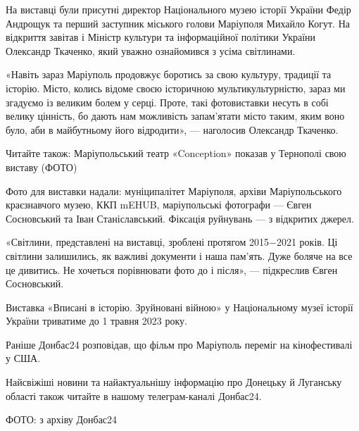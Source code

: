 На виставці були присутні директор Національного музею історії України Федір
Андрощук та перший заступник міського голови Маріуполя Михайло Когут. На
відкриття завітав і Міністр культури та інформаційної політики України
Олександр Ткаченко, який уважно ознайомився з усіма світлинами.

«Навіть зараз Маріуполь продовжує боротись за свою культуру, традиції та
історію. Місто, колись відоме своєю історичною мультикультурністю, зараз ми
згадуємо із великим болем у серці. Проте, такі фотовиставки несуть в собі
велику цінність, бо дають нам можливість запам’ятати місто таким, яким воно
було, аби в майбутньому його відродити», — наголосив Олександр Ткаченко.

Читайте також: Маріупольський театр «Conception» показав у Тернополі свою
виставу (ФОТО)

Фото для виставки надали: муніципалітет Маріуполя, архіви Маріупольського
краєзнавчого музею, ККП mEHUB, маріупольські фотографи — Євген Сосновський та
Іван Станіславський. Фіксація руйнувань — з відкритих джерел.

«Світлини, представлені на виставці, зроблені протягом 2015−2021 років. Ці
світлини залишились, як важливі документи і наша пам’ять. Дуже боляче на все це
дивитись. Не хочеться порівнювати фото до і після», — підкреслив Євген
Сосновський. 

Виставка «Вписані в історію. Зруйновані війною» у Національному музеї історії
України триватиме до 1 травня 2023 року.

Раніше Донбас24 розповідав, що фільм про Маріуполь переміг на кінофестивалі у
США.

Найсвіжіші новини та найактуальнішу інформацію про Донецьку й Луганську області
також читайте в нашому телеграм-каналі Донбас24.

ФОТО: з архіву Донбас24
